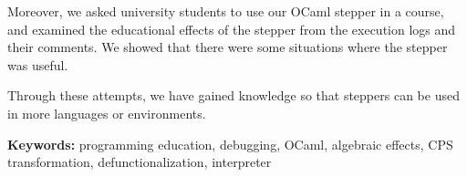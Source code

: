 Moreover, we asked university students
to use our OCaml stepper in a course,
and examined the educational effects of the stepper
from the execution logs and their comments.
We showed that there were some situations where the stepper was useful.

Through these attempts,
we have gained knowledge so that steppers can be used
in more languages or environments.

\vspace{10mm}



{\bf Keywords:}
programming education, debugging, OCaml, algebraic effects, CPS transformation, defunctionalization, interpreter
